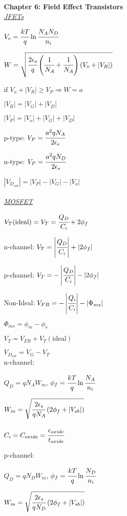 \documentclass{article}
\newcommand{\sect}[1]{\noindent\textbf{#1}\\}
\begin{document}
{\begin{multicols*}{2}
		\sect{Chapter 6: Field Effect Transistors}
		
		\noindent\underline{\textit{JFETs}}
		
		\noindent $V_o = \cfrac{kT}{q} \ln \cfrac{N_AN_D}{n_i}$
		
		\noindent $W = \sqrt{ \cfrac{2\epsilon_s}{q} \left(\cfrac{1}{N_A} + \cfrac{1}{N_A}\right)\left(V_o + |V_R|\right) }$
		
		\noindent if $V_o + |V_R| \geq V_P \Rightarrow W = a$
		
		\noindent $|V_R| = |V_G| + |V_D|$	
		
		\noindent $|V_P| = |V_o| + |V_G| + |V_D|$
		
		\noindent p-type: $V_P = \cfrac{a^2qN_A}{2\epsilon_s}$
		
		\noindent n-type: $V_P = \cfrac{a^2qN_D}{2\epsilon_s}$
		
		\noindent $|V_{D_{sat}}| = |V_P| - |V_G| - |V_o|$\\\\
		
		\noindent \underline{\textit{MOSFET}}
		
		\noindent $V_T(\text{ideal}) = V_T = \cfrac{Q_D}{C_i} + 2\phi_f$
		
		n-channel: $V_T = \left|\cfrac{Q_D}{C_i}\right| + \left|2\phi_f\right|$
		
		p-channel: $V_T = -\left|\cfrac{Q_D}{C_i}\right| - \left|2\phi_f\right|$
		
		\noindent Non-Ideal: $V_{FB} = -\left|\cfrac{Q_i}{C_i}\right| - \left|\Phi_{ms}\right|$
		
		$\Phi_{ms} = \phi_m - \phi_s$
		
		$V_T = V_{FB} + V_T(\text{ideal})$
		
		$V_{D_{sat}} = V_G - V_T$\\
		
		\noindent n-channel:
		
		$Q_D = qN_AW_m$, $\phi_f = \cfrac{kT}{q} \ln \cfrac{N_A}{n_i}$
		
		$W_m = \sqrt{\cfrac{2\epsilon_s}{qN_A}\left(2\phi_f + \left|V_{sb}\right|\right)}$
		
		$C_i = C_{oxide} = \cfrac{\epsilon_{oxide}}{t_{oxide}}$ 
		
		\noindent p-channel:
		
		$Q_D = qN_DW_m$, $\phi_f = \cfrac{kT}{q} \ln \cfrac{N_D}{n_i}$
		
		$W_m = \sqrt{\cfrac{2\epsilon_s}{qN_D}\left(2\phi_f + \left|V_{sb}\right|\right)}$
		

\end{multicols*}}
\end{document}
